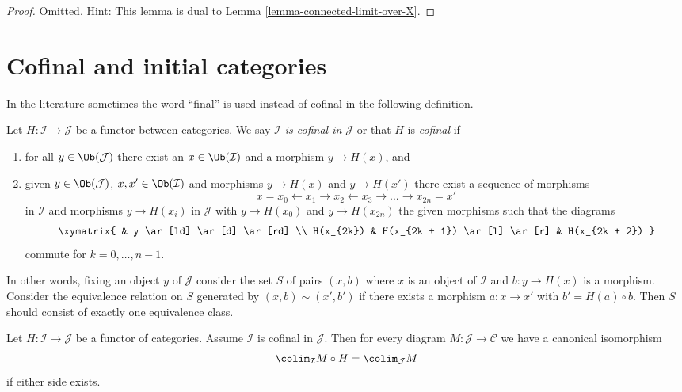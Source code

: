 \begin{proof}
Omitted. Hint: This lemma is dual to Lemma \ref{lemma-connected-limit-over-X}.
\end{proof}




\section{Cofinal and initial categories}
\label{section-cofinal}

\noindent
In the literature sometimes the word ``final'' is used instead of cofinal
in the following definition.

\begin{definition}
\label{definition-cofinal}
Let $H : \mathcal{I} \to \mathcal{J}$ be a functor between categories.
We say {\it $\mathcal{I}$ is cofinal in $\mathcal{J}$} or that
$H$ is {\it cofinal} if
\begin{enumerate}
\item for all $y \in \Ob(\mathcal{J})$ there exist an
$x \in \Ob(\mathcal{I})$ and a morphism $y \to H(x)$, and
\item given $y \in \Ob(\mathcal{J})$, $x, x' \in \Ob(\mathcal{I})$
and morphisms $y \to H(x)$ and $y \to H(x')$ there exist a sequence
of morphisms
$$
x = x_0 \leftarrow x_1 \rightarrow x_2 \leftarrow x_3 \rightarrow \ldots
\rightarrow x_{2n} = x'
$$
in $\mathcal{I}$ and morphisms $y \to H(x_i)$ in $\mathcal{J}$
with $y \to H(x_0)$ and $y \to H(x_{2n})$ the given morphisms
such that the diagrams
$$
\xymatrix{
& y \ar[ld] \ar[d] \ar[rd] \\
H(x_{2k}) & H(x_{2k + 1}) \ar[l] \ar[r] & H(x_{2k + 2})
}
$$
commute for $k = 0, \ldots, n - 1$.
\end{enumerate}
In other words, fixing an object $y$ of $\mathcal{J}$ consider the
set $S$ of pairs $(x, b)$ where $x$ is an object of $\mathcal{I}$ and
$b : y \to H(x)$ is a morphism. Consider the equivalence relation
on $S$ generated by $(x, b) \sim (x', b')$ if there exists a
morphism $a : x \to x'$ with $b' = H(a) \circ b$. Then $S$ should
consist of exactly one equivalence class.
\end{definition}

\begin{lemma}
\label{lemma-cofinal}
Let $H : \mathcal{I} \to \mathcal{J}$ be a functor of categories. Assume
$\mathcal{I}$ is cofinal in $\mathcal{J}$. Then for every diagram
$M : \mathcal{J} \to \mathcal{C}$ we have a canonical isomorphism
$$
\colim_\mathcal{I} M \circ H
=
\colim_\mathcal{J} M
$$
if either side exists.
\end{lemma}

